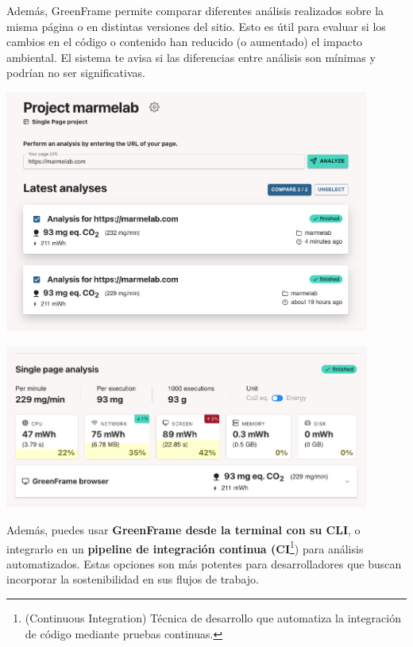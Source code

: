 \documentclass[12pt,a4paper]{report}
\begin{document}
Además, GreenFrame permite comparar diferentes análisis realizados sobre la
misma página o en distintas versiones del sitio. Esto es útil para evaluar si
los cambios en el código o contenido han reducido (o aumentado) el impacto
ambiental. El sistema te avisa si las diferencias entre análisis son mínimas y
podrían no ser significativas.

\begin{center}
  \includegraphics[width=0.9\textwidth]{imagenes/Greenframe_7.png}
\end{center}

\begin{center}
  \includegraphics[width=0.9\textwidth]{imagenes/Greenframe_8.png}
\end{center}

Además, puedes usar \textbf{GreenFrame desde la terminal con su CLI}, o
integrarlo en un \textbf{pipeline de integración continua
  (CI}\footnote{(Continuous Integration) Técnica de desarrollo que automatiza la
  integración de código mediante pruebas continuas.}) para análisis
automatizados. Estas opciones son más potentes para desarrolladores que buscan
incorporar la sostenibilidad en sus flujos de trabajo.
\end{document}
